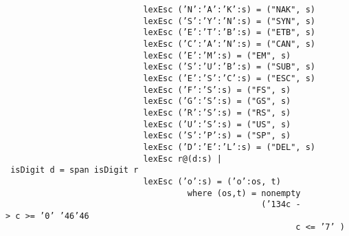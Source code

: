 \mbox{\tt \ \ \ \ \ \ \ \ \ \ \ \ \ \ \ \ \ \ \ \ \ \ \ \ \ \ \ \ lexEsc\ ('N':'A':'K':s)\ =\ ("NAK",\ s)}\\
\mbox{\tt \ \ \ \ \ \ \ \ \ \ \ \ \ \ \ \ \ \ \ \ \ \ \ \ \ \ \ \ lexEsc\ ('S':'Y':'N':s)\ =\ ("SYN",\ s)}\\
\mbox{\tt \ \ \ \ \ \ \ \ \ \ \ \ \ \ \ \ \ \ \ \ \ \ \ \ \ \ \ \ lexEsc\ ('E':'T':'B':s)\ =\ ("ETB",\ s)}\\
\mbox{\tt \ \ \ \ \ \ \ \ \ \ \ \ \ \ \ \ \ \ \ \ \ \ \ \ \ \ \ \ lexEsc\ ('C':'A':'N':s)\ =\ ("CAN",\ s)}\\
\mbox{\tt \ \ \ \ \ \ \ \ \ \ \ \ \ \ \ \ \ \ \ \ \ \ \ \ \ \ \ \ lexEsc\ ('E':'M':s)\ =\ ("EM",\ s)}\\
\mbox{\tt \ \ \ \ \ \ \ \ \ \ \ \ \ \ \ \ \ \ \ \ \ \ \ \ \ \ \ \ lexEsc\ ('S':'U':'B':s)\ =\ ("SUB",\ s)}\\
\mbox{\tt \ \ \ \ \ \ \ \ \ \ \ \ \ \ \ \ \ \ \ \ \ \ \ \ \ \ \ \ lexEsc\ ('E':'S':'C':s)\ =\ ("ESC",\ s)}\\
\mbox{\tt \ \ \ \ \ \ \ \ \ \ \ \ \ \ \ \ \ \ \ \ \ \ \ \ \ \ \ \ lexEsc\ ('F':'S':s)\ =\ ("FS",\ s)}\\
\mbox{\tt \ \ \ \ \ \ \ \ \ \ \ \ \ \ \ \ \ \ \ \ \ \ \ \ \ \ \ \ lexEsc\ ('G':'S':s)\ =\ ("GS",\ s)}\\
\mbox{\tt \ \ \ \ \ \ \ \ \ \ \ \ \ \ \ \ \ \ \ \ \ \ \ \ \ \ \ \ lexEsc\ ('R':'S':s)\ =\ ("RS",\ s)}\\
\mbox{\tt \ \ \ \ \ \ \ \ \ \ \ \ \ \ \ \ \ \ \ \ \ \ \ \ \ \ \ \ lexEsc\ ('U':'S':s)\ =\ ("US",\ s)}\\
\mbox{\tt \ \ \ \ \ \ \ \ \ \ \ \ \ \ \ \ \ \ \ \ \ \ \ \ \ \ \ \ lexEsc\ ('S':'P':s)\ =\ ("SP",\ s)}\\
\mbox{\tt \ \ \ \ \ \ \ \ \ \ \ \ \ \ \ \ \ \ \ \ \ \ \ \ \ \ \ \ lexEsc\ ('D':'E':'L':s)\ =\ ("DEL",\ s)}\\
\mbox{\tt \ \ \ \ \ \ \ \ \ \ \ \ \ \ \ \ \ \ \ \ \ \ \ \ \ \ \ \ lexEsc\ r@(d:s)\ |\ isDigit\ d\ =\ span\ isDigit\ r}\\
\mbox{\tt \ \ \ \ \ \ \ \ \ \ \ \ \ \ \ \ \ \ \ \ \ \ \ \ \ \ \ \ lexEsc\ ('o':s)\ =\ ('o':os,\ t)}\\
\mbox{\tt \ \ \ \ \ \ \ \ \ \ \ \ \ \ \ \ \ \ \ \ \ \ \ \ \ \ \ \ \ \ \ \ \ \ \ \ \ where\ (os,t)\ =\ nonempty}\\
\mbox{\tt \ \ \ \ \ \ \ \ \ \ \ \ \ \ \ \ \ \ \ \ \ \ \ \ \ \ \ \ \ \ \ \ \ \ \ \ \ \ \ \ \ \ \ \ \ \ \ \ \ \ \ \ ({\char'134}c\ ->\ c\ >=\ '0'\ {\char'46}{\char'46}}\\
\mbox{\tt \ \ \ \ \ \ \ \ \ \ \ \ \ \ \ \ \ \ \ \ \ \ \ \ \ \ \ \ \ \ \ \ \ \ \ \ \ \ \ \ \ \ \ \ \ \ \ \ \ \ \ \ \ \ \ \ \ \ \ c\ <=\ '7'\ )}
